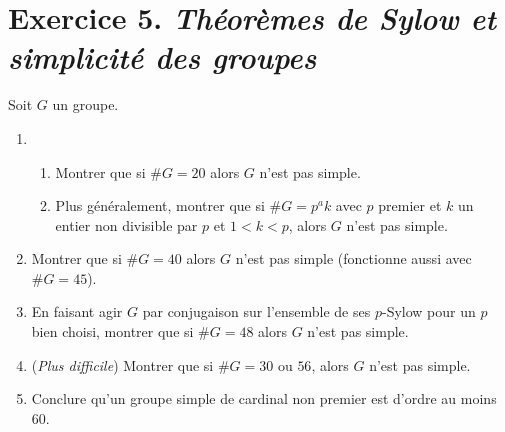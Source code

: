 \documentclass[./main]{subfiles}
\begin{document}
  \section{Exercice 5. \textit{Théorèmes de Sylow et simplicité des groupes}}

  \begin{enonce}
    Soit $G$ un groupe.
    \begin{enumerate}
      \item 
        \begin{enumerate}
          \item Montrer que si $\#G = 20$ alors  $G$ n'est pas simple.
          \item Plus généralement, montrer que si $\#G = p^a k$ avec $p$ premier et $k$ un entier non divisible par $p$ et $1 < k < p$, alors  $G$ n'est pas simple.
        \end{enumerate}
      \item Montrer que si $\# G = 40$ alors  $G$ n'est pas simple (fonctionne aussi avec $\#G = 45$).
      \item En faisant agir $G$ par conjugaison sur l'ensemble de ses $p$-Sylow pour un $p$ bien choisi, montrer que si $\# G = 48$ alors  $G$ n'est pas simple.
      \item (\textit{Plus difficile}) Montrer que si $\#G = 30$ ou $56$, alors $G$ n'est pas simple.
      \item Conclure qu'un groupe simple de cardinal non premier est d'ordre au moins $60$.
    \end{enumerate}
  \end{enonce}
\end{document}
